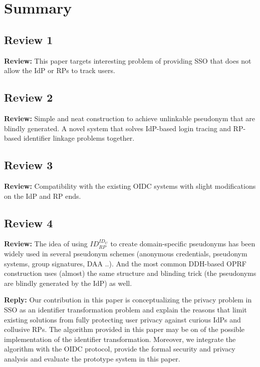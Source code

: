 \documentclass[letterpaper,onecolumn,10pt]{article}
\begin{document}
\section*{Summary}


\subsection*{Review 1}
\vspace{1mm}\noindent\textbf{Review:}
This paper targets interesting problem of providing SSO that does not allow the IdP or RPs to track users.


\subsection*{Review 2}
\vspace{1mm}\noindent\textbf{Review:}
Simple and neat construction to achieve unlinkable pseudonym that are blindly generated.
A novel system that solves IdP-based login tracing and RP-based identifier linkage problems together.

\subsection*{Review 3}
\vspace{1mm}\noindent\textbf{Review:}
Compatibility with the existing OIDC systems with slight modifications on the IdP and RP ends.

\subsection*{Review 4}
\vspace{1mm}\noindent\textbf{Review:}
The idea of using $ID_{RP}^{ID_U}$ to create domain-specific pseudonyms has been widely used in several pseudonym schemes (anonymous credentials, pseudonym systems, group signatures, DAA ..). And the most common DDH-based OPRF construction uses (almost) the same structure and blinding trick (the pseudonyms are blindly generated by the IdP) as well.

\vspace{1mm}\noindent\textbf{Reply:}
Our contribution in this paper is conceptualizing the
privacy problem in SSO as an identifier transformation problem and explain the reasons that limit existing solutions from fully protecting user privacy against curious IdPs and collusive RPs.
The algorithm provided in this paper may be on of the possible implementation of the identifier transformation.
Moreover, we integrate the algorithm with the OIDC protocol, provide the formal security and privacy analysis and evaluate the prototype system in this paper.
\end{document}
